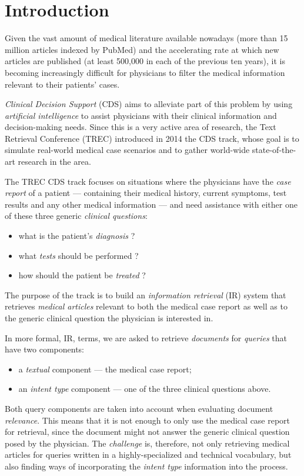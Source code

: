 \chapter{Introduction}
Given the vast amount of medical literature available nowadays (more than 15 million articles indexed by PubMed)
and the accelerating rate at which new articles are published (at least 500,000 in each of the previous ten years),
it is becoming increasingly difficult for physicians to filter the medical information
relevant to their patients' cases.

\emph{Clinical Decision Support} (CDS) aims to alleviate part of this problem by using \emph{artificial intelligence}
to assist physicians with their clinical information and decision-making needs.
Since this is a very active area of research,
the Text Retrieval Conference (TREC)
introduced in 2014 the CDS track,
whose goal is to simulate real-world medical case scenarios and to gather world-wide state-of-the-art research in the area.

The TREC CDS track focuses on situations where the physicians have the \emph{case report} of a patient
--- containing their medical history, current symptoms, test results and any other medical information ---
and need assistance with either one of these three generic
\emph{clinical questions}:
\begin{itemize}[noitemsep,nolistsep]
 \item what is the patient's \emph{diagnosis} ?
 \item what \emph{tests} should be performed ?
 \item how should the patient be \emph{treated} ?\end{itemize}

The purpose of the track is to build an \emph{information retrieval} (IR) system that
retrieves \emph{medical articles} relevant to both the medical
case report as well as to the generic clinical question the physician is interested in.

In more formal, IR, terms, we are asked to retrieve \emph{documents} for \emph{queries} that have two components:
\begin{itemize}[noitemsep, nolistsep]
 \item a \emph{textual} component --- the medical case report;
 \item an \emph{intent type} component --- one of the three clinical questions above.
\end{itemize}

Both query components are taken into account when evaluating document \emph{relevance}.
This means that it is not enough to only use the medical case report
for retrieval, since the document might not answer the generic clinical question posed by the physician.
The \emph{challenge} is, therefore, not only retrieving medical articles for queries written in a highly-specialized and technical
vocabulary, but also finding ways of incorporating the \emph{intent type} information into the process.

